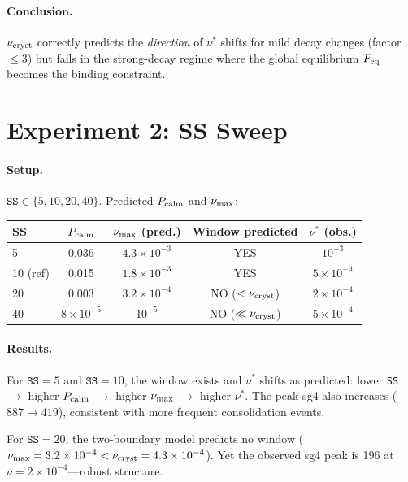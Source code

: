 \documentclass[11pt]{article}
\begin{document}
\paragraph{Conclusion.}
$\nu_{\rm cryst}$ correctly predicts the \emph{direction} of $\nu^*$ shifts for
mild decay changes (factor $\leq 3$) but fails in the strong-decay regime where
the global equilibrium $F_{\rm eq}$ becomes the binding constraint.

\section{Experiment 2: SS Sweep}

\paragraph{Setup.}
$\texttt{SS} \in \{5, 10, 20, 40\}$.
Predicted $P_{\rm calm}$ and $\nu_{\rm max}$:

\begin{center}
\begin{tabular}{lcccc}
\toprule
SS & $P_{\rm calm}$ & $\nu_{\rm max}$ (pred.) & Window predicted & $\nu^*$ (obs.) \\
\midrule
5         & 0.036 & $4.3\times10^{-3}$ & YES                    & $10^{-3}$ \\
10 (ref)  & 0.015 & $1.8\times10^{-3}$ & YES                    & $5\times10^{-4}$ \\
20        & 0.003 & $3.2\times10^{-4}$ & NO ($<\nu_{\rm cryst}$) & $2\times10^{-4}$ \\
40        & $8\times10^{-5}$ & $10^{-5}$ & NO ($\ll\nu_{\rm cryst}$) & $5\times10^{-4}$ \\
\bottomrule
\end{tabular}
\end{center}

\paragraph{Results.}
For $\texttt{SS}=5$ and $\texttt{SS}=10$, the window exists and $\nu^*$ shifts
as predicted: lower \texttt{SS} $\to$ higher $P_{\rm calm}$ $\to$ higher
$\nu_{\rm max}$ $\to$ higher $\nu^*$.
The peak sg4 also increases ($887 \to 419$), consistent with more frequent
consolidation events.

For $\texttt{SS}=20$, the two-boundary model predicts no window
($\nu_{\rm max} = 3.2\times10^{-4} < \nu_{\rm cryst} = 4.3\times10^{-4}$).
Yet the observed sg4 peak is 196 at $\nu = 2\times10^{-4}$---robust structure.
\end{document}
